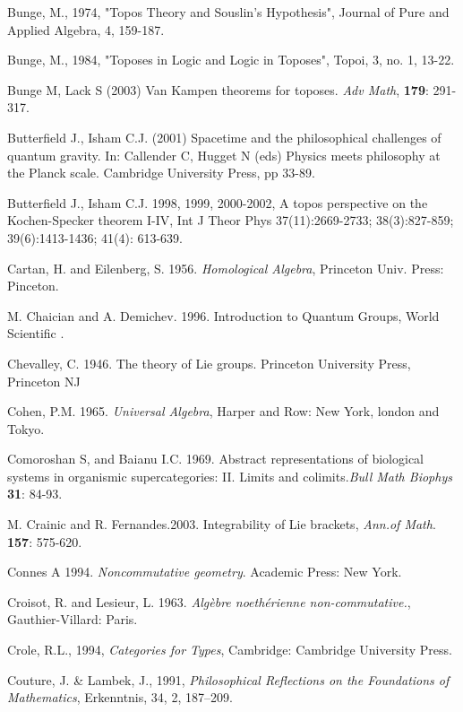 \documentclass[12pt]{article}
\begin{document}
\begin{thebibliography}{399}
Bunge, M., 1974, "Topos Theory and Souslin's Hypothesis", Journal of Pure and Applied Algebra, 4, 159-187.  

Bunge, M., 1984, "Toposes in Logic and Logic in Toposes", Topoi, 3, no. 1, 13-22. 

Bunge M, Lack S (2003) Van Kampen theorems for toposes. {\em Adv Math}, \textbf {179}: 291-317.

Butterfield J., Isham C.J. (2001) Spacetime and the philosophical challenges of quantum gravity. In:
Callender C, Hugget N (eds) Physics meets philosophy at the Planck scale. Cambridge University
Press, pp 33-89.

Butterfield J., Isham C.J. 1998, 1999, 2000-2002, A topos perspective on the Kochen-Specker theorem
I-IV, Int J Theor Phys 37(11):2669-2733; 38(3):827-859; 39(6):1413-1436; 41(4): 613-639.

Cartan, H. and Eilenberg, S. 1956. {\em Homological Algebra}, Princeton Univ. Press: Pinceton. 

M. Chaician and A. Demichev. 1996. Introduction to Quantum Groups, World Scientific .

Chevalley, C. 1946. The theory of Lie groups. Princeton University Press, Princeton NJ

Cohen, P.M. 1965. {\em Universal Algebra}, Harper and Row: New York, london and Tokyo.

Comoroshan S, and Baianu I.C. 1969. Abstract representations of biological systems in organismic
supercategories: II. Limits and colimits.{\em  Bull Math Biophys} \textbf {31}: 84-93.

M. Crainic and R. Fernandes.2003. Integrability of Lie brackets, {\em Ann.of Math}. \textbf{157}: 575-620.

Connes A 1994. \emph{Noncommutative geometry}. Academic Press: New York.

Croisot, R. and Lesieur, L. 1963. \emph{Alg\`ebre noeth\'erienne non-commutative.},
Gauthier-Villard: Paris.

Crole, R.L., 1994, {\em Categories for Types}, Cambridge: Cambridge University Press.  

Couture, J. \& Lambek, J., 1991, {\em Philosophical Reflections on the Foundations of Mathematics}, Erkenntnis, 34, 2, 187--209. 


\end{thebibliography}
\end{document}
